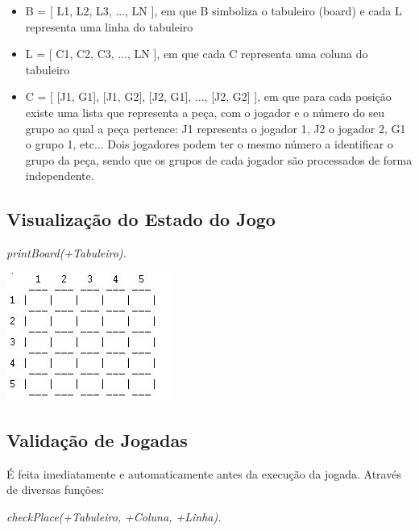 \documentclass[a4paper]{article}
\begin{document}
\begin{itemize}

\item B = [ L1, L2, L3, ..., LN ], em que B simboliza o tabuleiro (board) e cada L representa uma linha do tabuleiro
\item L = [ C1, C2, C3, ..., LN ], em que cada C representa uma coluna do tabuleiro
\item C = [ [J1, G1], [J1, G2], [J2, G1], ..., [J2, G2] ], em que para cada posição existe uma lista que representa a peça, com o jogador e o número do seu grupo ao qual a peça pertence: J1 representa o jogador 1, J2 o jogador 2, G1 o grupo 1, etc... Dois jogadores podem ter o mesmo número a identificar o grupo da peça, sendo que os grupos de cada jogador são processados de forma independente.

\end{itemize}

\subsection{Visualização do Estado do Jogo} 
\textit{printBoard(+Tabuleiro).}

\includegraphics{prologMap.JPG}


\subsection{Validação de Jogadas} É feita imediatamente e automaticamente antes da execução da jogada. Através de diversas funções:

\textit{checkPlace(+Tabuleiro, +Coluna, +Linha).}
\end{document}
